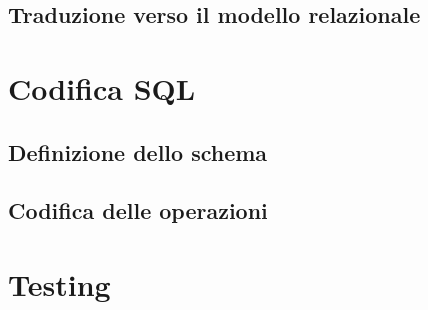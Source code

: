 \documentclass[11pt]{article}
\begin{document}
\subsection{Traduzione verso il modello relazionale}

\section{Codifica SQL}
\subsection{Definizione dello schema}
\subsection{Codifica delle operazioni}

\section{Testing}
\end{document}
